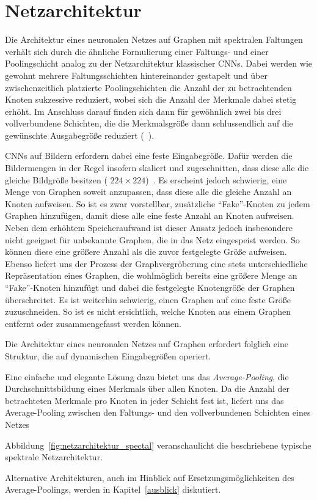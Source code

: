 \section{Netzarchitektur}
\label{spektrale_netzarchitektur}

Die Architektur eines neuronalen Netzes auf Graphen mit spektralen Faltungen verhält sich durch die ähnliche Formulierung einer Faltungs- und einer Poo\-ling\-sch\-icht analog zu der Netzarchitektur klassischer \glspl{CNN}.
Dabei werden wie gewohnt mehrere Faltungsschichten hintereinander gestapelt und über zwischenzeitlich platzierte Poolingschichten die Anzahl der zu betrachtenden Knoten sukzessive reduziert, wobei sich die Anzahl der Merkmale dabei stetig erhöht.
Im Anschluss darauf finden sich dann für gewöhnlich zwei bis drei vollverbundene Schichten, die die Merkmalsgröße dann schlussendlich auf die gewünschte Ausgabegröße reduziert (\vgl{}~\cite{Nielsen}).

\glspl{CNN} auf Bildern erfordern dabei eine feste Eingabegröße.
Dafür werden die Bildermengen in der Regel insofern skaliert und zugeschnitten, dass diese alle die gleiche Bildgröße besitzen (\zB{} $224 \times 224$)~\cite{spp}.
Es erscheint jedoch schwierig, eine Menge von Graphen soweit anzupassen, dass diese alle die gleiche Anzahl an Knoten aufweisen.
So ist es zwar vorstellbar, zusätzliche \enquote{Fake}-Knoten zu jedem Graphen hinzufügen, damit diese alle eine feste Anzahl an Knoten aufweisen.
Neben dem erhöhtem Speicheraufwand ist dieser Ansatz jedoch insbesondere nicht geeignet für unbekannte Graphen, die in das Netz eingespeist werden.
So können diese \evtl{} eine größere Anzahl als die zuvor festgelegte Größe aufweisen.
Ebenso liefert uns der Prozess der Graphvergröberung eine stets unterschiedliche Repräsentation eines Graphen, die wohlmöglich bereits eine größere Menge an \enquote{Fake}-Knoten hinzufügt und dabei die festgelegte Knotengröße der Graphen überschreitet.
Es ist weiterhin schwierig, einen Graphen auf eine feste Größe zuzuschneiden.
So ist es nicht ersichtlich, welche Knoten aus einem Graphen entfernt oder zusammengefasst werden können.

Die Architektur eines neuronalen Netzes auf Graphen erfordert folglich eine Struktur, die auf dynamischen Eingabegrößen operiert.

Eine einfache und elegante Lösung dazu bietet uns das \emph{Average-Pooling}, \dhe{} die Durchschnittsbildung eines Merkmals über allen Knoten.
Da die Anzahl der betrachteten Merkmale pro Knoten in jeder Schicht fest ist, liefert uns das Average-Pooling zwischen den Faltungs- und den vollverbundenen Schichten eines Netzes


Abbildung~\ref{fig:netzarchitektur_spectal} veranschaulicht die beschriebene typische spektrale Netzarchitektur.

Alternative Architekturen, auch im Hinblick auf Ersetzungsmöglichkeiten des Average-Poolings, werden in Kapitel~\ref{ausblick} diskutiert.
